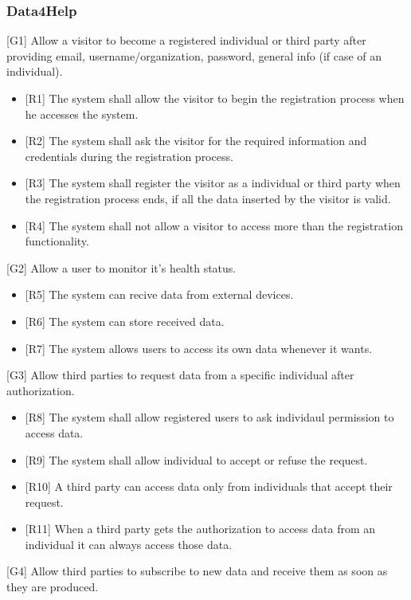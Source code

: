 \documentclass[12pt]{article}
\begin{document}
\subsubsection{Data4Help}
[G1] Allow a visitor to become a registered individual or third party after providing email, username/organization, password, general info (if case of an individual). \newline
\begin{itemize}
    \item{[R1]} The system shall allow the visitor to begin the registration process when he accesses the system.
    \item{[R2]} The system shall ask the visitor for the required information and credentials during the registration process.
    \item{[R3]} The system shall register the visitor as a individual or third party when the registration process ends, if all the data inserted by the visitor is valid.
    \item{[R4]} The system shall not allow a visitor to access more than the registration functionality.
\end{itemize}
[G2] Allow a user to monitor it's health status.\newline 
\begin{itemize}
    \item {[R5]} The system can recive data from external devices. 
    \item {[R6]} The system can store received data. 
    \item {[R7]} The system allows users to access its own data whenever it wants.
\end{itemize}
[G3] Allow third parties to request data from a specific individual after authorization.\newline 
\begin{itemize}
    \item {[R8]} The system shall allow registered users to ask individaul permission to access data.
    \item {[R9]} The system shall allow individual to accept or refuse the request. 
    \item {[R10]} A third party can access data only from individuals that accept their request.
    \item {[R11]} When a third party gets the authorization to access data from an individual it can always access those data. 
\end{itemize}
[G4] Allow third parties to subscribe to new data and receive them as soon as they are produced.\newline 
\end{document}
